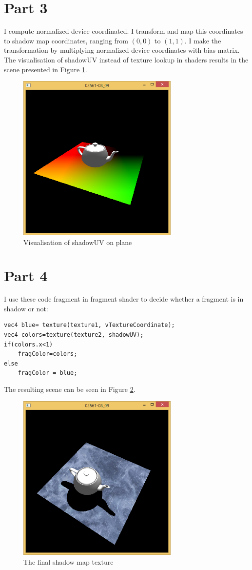 \section{Part 3}

I compute normalized device coordinated. I transform and map this coordinates to shadow map coordinates, ranging from $(0,0)$ to $(1,1)$. I make the transformation by multiplying normalized device coordinates with bias matrix. The visualisation of shadowUV instead of texture lookup in shaders results in the scene presented in Figure \ref{fig:8-3}.

\begin{figure}[hp]
\centering
\includegraphics[width=8cm]{../Screenshots/ex-8/3.png}
\caption{Visualisation of shadowUV on plane}
\label{fig:8-3}
\end{figure}

\section{Part 4}

I use these code fragment in fragment shader to decide whether a fragment is in shadow or not: \\

\begin{lstlisting}
vec4 blue= texture(texture1, vTextureCoordinate);
vec4 colors=texture(texture2, shadowUV);
if(colors.x<1)
	fragColor=colors;
else
	fragColor = blue;
\end{lstlisting}


The resulting scene can be seen in Figure \ref{fig:8-4}.

\begin{figure}[hp]
\centering
\includegraphics[width=8cm]{../Screenshots/ex-8/4.png}
\caption{The final shadow map texture}
\label{fig:8-4}
\end{figure}

